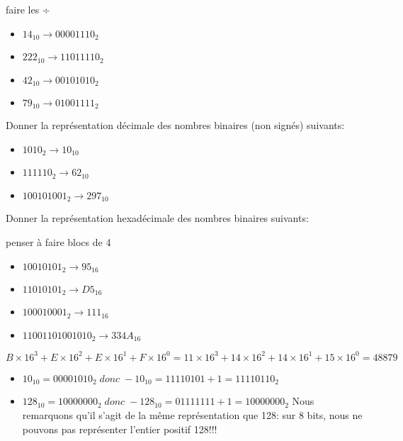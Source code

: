 \documentclass[a4paper,11pt]{article}
\begin{document}
\begin{Form}
\begin{exo}
\begin{commentprof}
faire les ÷
\end{commentprof}
\begin{itemize}
\item $14_{10} \rightarrow 00001110_2$
\item $222_{10} \rightarrow 11011110_2$
\item $42_{10} \rightarrow 00101010_2$
\item $79_{10} \rightarrow 01001111_2$
\end{itemize}
\end{exo}
\begin{exo}
Donner la représentation décimale des nombres binaires (non signés) suivants:
\begin{itemize}
\item $1010_2 \rightarrow 10_{10}$
\item $111110_2 \rightarrow 62_{10}$
\item $100101001_2 \rightarrow 297_{10}$
\end{itemize}
\end{exo}
\begin{exo}
Donner la représentation hexadécimale des nombres binaires suivants:
\begin{commentprof}
penser à faire blocs de 4
\end{commentprof}
\begin{itemize}
\item $10010101_2 \rightarrow 95_{16}$
\item $11010101_2 \rightarrow D5_{16}$
\item $100010001_2 \rightarrow 111_{16}$
\item $11001101001010_2 \rightarrow 334A_{16}$
\end{itemize}
\end{exo}
\begin{exo}
$B×16^3+E×16^2+E×16^1+F×16^0=11×16^3+14×16^2+14×16^1+15×16^0=48879$
\end{exo}
\begin{exo}
\begin{itemize}
\item $10_{10}=00001010_2\;donc\;-10_{10}=11110101+1=11110110_2$
\item $128_{10}=10000000_2\;donc\;-128_{10}=01111111+1=10000000_2$ Nous remarquons qu'il s'agit de la même représentation que 128: sur 8 bits, nous ne pouvons pas représenter l'entier positif 128!!!

\end{itemize}
\end{exo}
\end{Form}
\end{document}
